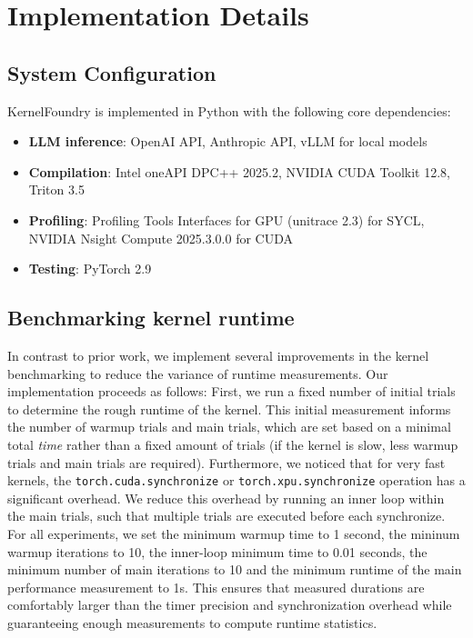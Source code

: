 \section{Implementation Details} \label{app:implementation}

\subsection{System Configuration}

KernelFoundry is implemented in Python with the following core dependencies:
\begin{itemize}\itemsep0em
    \item \textbf{LLM inference}: OpenAI API, Anthropic API, vLLM for local models
    \item \textbf{Compilation}: Intel oneAPI DPC++ 2025.2, NVIDIA CUDA Toolkit 12.8, Triton 3.5
    \item \textbf{Profiling}: Profiling Tools Interfaces for GPU (unitrace 2.3) for SYCL, NVIDIA Nsight Compute 2025.3.0.0 for CUDA
    \item \textbf{Testing}: PyTorch 2.9
\end{itemize}


\subsection{Benchmarking kernel runtime}\label{app:benchmarking}

In contrast to prior work, we implement several improvements in the kernel benchmarking to reduce the variance of runtime measurements. Our implementation proceeds as follows: First, we run a fixed number of initial trials to determine the rough runtime of the kernel. This initial measurement informs the number of warmup trials and main trials, which are set based on a minimal total \textit{time} rather than a fixed amount of trials (if the kernel is slow, less warmup trials and main trials are required). Furthermore, we noticed that for very fast kernels, the \texttt{torch.cuda.synchronize} or \texttt{torch.xpu.synchronize} operation has a significant overhead. We reduce this overhead by running an inner loop within the main trials, such that multiple trials are executed before each synchronize.\\
For all experiments, we set the minimum warmup time to 1 second, the mininum warmup iterations to 10, the inner-loop minimum time to 0.01 seconds, the minimum number of main iterations to 10 and the minimum runtime of the main performance measurement to 1s. This ensures that measured durations are comfortably larger than the timer precision and synchronization overhead while guaranteeing enough measurements to compute runtime statistics.

